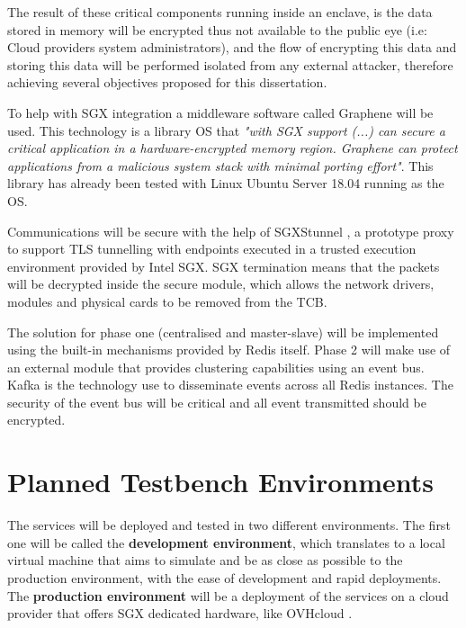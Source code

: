 The result of these critical components running inside an enclave, is the data stored in memory will be encrypted thus not available to the public eye (i.e: Cloud providers system administrators), and the flow of encrypting this data and storing this data will be performed isolated from any external attacker, therefore achieving several objectives proposed for this dissertation.

To help with \gls{SGX} integration a middleware software called Graphene \cite{graphene:1} will be used. This technology is a library \gls{OS} that \textit{"with \gls{SGX} support (...) can secure a critical application in a hardware-encrypted memory region. Graphene can protect applications from a malicious system stack with minimal porting effort"}. This library has already been tested with Linux Ubuntu Server 18.04 running as the \gls{OS}.

Communications will be secure with the help of SGXStunnel \cite{sgxstunnel:1}, a prototype proxy to support TLS tunnelling with endpoints executed in a trusted execution environment provided by Intel SGX. \gls{SGX} termination means that the packets will be decrypted inside the secure module, which allows the network drivers, modules and physical cards to be removed from the \gls{TCB}.

The solution for phase one (centralised and master-slave) will be implemented using the built-in mechanisms provided by Redis itself. Phase 2 will make use of an external module that provides clustering capabilities using an event bus. Kafka \cite{kafka:1} is the technology use to disseminate events across all Redis instances. The security of the event bus will be critical and all event transmitted should be encrypted.

\section{Planned Testbench Environments} %
\label{sec:planned_testbench_environments}

The services will be deployed and tested in two different environments. The first one will be called the \textbf{development environment}, which translates to a local virtual machine that aims to simulate and be as close as possible to the production environment, with the ease of development and rapid deployments. The \textbf{production environment} will be a deployment of the services on a cloud provider that offers \gls{SGX} dedicated hardware, like OVHcloud \cite{ovhcloud:1}.

